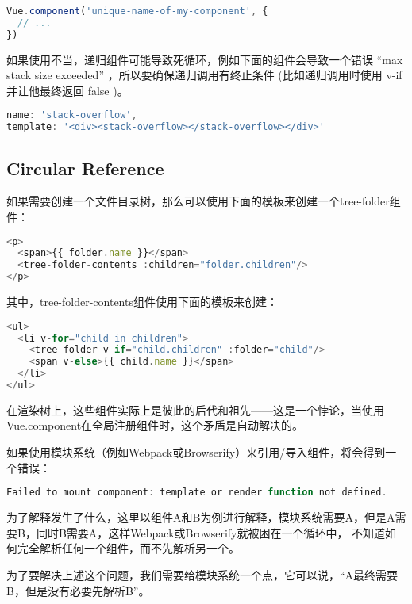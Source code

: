 \begin{lstlisting}[language=JavaScript]
Vue.component('unique-name-of-my-component', {
  // ...
})
\end{lstlisting}

如果使用不当，递归组件可能导致死循环，例如下面的组件会导致一个错误 “max stack size exceeded” ，所以要确保递归调用有终止条件 (比如递归调用时使用 v-if 并让他最终返回 false )。


\begin{lstlisting}[language=JavaScript]
name: 'stack-overflow',
template: '<div><stack-overflow></stack-overflow></div>'
\end{lstlisting}



\subsection{Circular Reference}

如果需要创建一个文件目录树，那么可以使用下面的模板来创建一个tree-folder组件：


\begin{lstlisting}[language=JavaScript]
<p>
  <span>{{ folder.name }}</span>
  <tree-folder-contents :children="folder.children"/>
</p>
\end{lstlisting}

其中，tree-folder-contents组件使用下面的模板来创建：

\begin{lstlisting}[language=JavaScript]
<ul>
  <li v-for="child in children">
    <tree-folder v-if="child.children" :folder="child"/>
    <span v-else>{{ child.name }}</span>
  </li>
</ul>
\end{lstlisting}

在渲染树上，这些组件实际上是彼此的后代和祖先——这是一个悖论，当使用Vue.component在全局注册组件时，这个矛盾是自动解决的。

如果使用模块系统（例如Webpack或Browserify）来引用/导入组件，将会得到一个错误：


\begin{lstlisting}[language=JavaScript]
Failed to mount component: template or render function not defined.
\end{lstlisting}

为了解释发生了什么，这里以组件A和B为例进行解释，模块系统需要A，但是A需要B，同时B需要A，这样Webpack或Browserify就被困在一个循环中， 不知道如何完全解析任何一个组件，而不先解析另一个。 

为了要解决上述这个问题，我们需要给模块系统一个点，它可以说，“A最终需要B，但是没有必要先解析B”。

